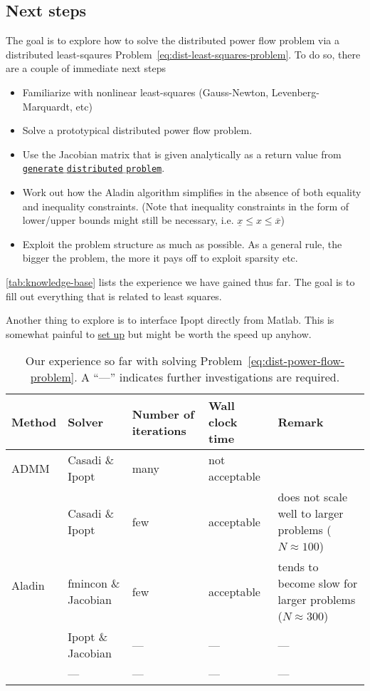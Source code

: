 \documentclass{article}
\begin{document}
\subsection{Next steps}

The goal is to explore how to solve the distributed power flow problem via a distributed least-sqaures Problem~\ref{eq:dist-least-squares-problem}.
To do so, there are a couple of immediate next steps
\begin{itemize}
    \item Familiarize with nonlinear least-squares (Gauss-Newton, Levenberg-Marquardt, etc)
    \item Solve a prototypical distributed power flow problem.
    \item Use the Jacobian matrix that is given analytically as a return value from \href{https://iai-vcs.iai.kit.edu/advancedcontrol/code/morenet/morenet/-/blob/master/03_parser/generate_distributed_problem.m}{\texttt{generate$\_$distributed$\_$problem}}.
    \item Work out how the Aladin algorithm simplifies in the absence of both equality and inequality constraints. (Note that inequality constraints in the form of lower/upper bounds might still be necessary, i.e. $\underline{x} \leq x \leq \overline{x}$)
    \item Exploit the problem structure as much as possible. As a general rule, the bigger the problem, the more it pays off to exploit sparsity etc.
\end{itemize}
\autoref{tab:knowledge-base} lists the experience we have gained thus far.
The goal is to fill out everything that is related to least squares.

Another thing to explore is to interface Ipopt directly from Matlab.
This is somewhat painful to \href{https://projects.coin-or.org/Ipopt/wiki/MatlabInterface}{set up} but might be worth the speed up anyhow.

\begin{table}
    \centering
    \caption{Our experience so far with solving Problem~\ref{eq:dist-power-flow-problem}. A ``---'' indicates further investigations are required.\label{tab:knowledge-base}}
    \begin{tabular}{llllp{4cm}}
        \toprule
        Method & Solver & Number of iterations & Wall clock time & Remark\\
        \midrule
        ADMM & Casadi \& Ipopt & many & not acceptable\\
        \midrule
        \multirow{5}{*}{Aladin} & Casadi \& Ipopt & few & acceptable & does not scale well to larger problems ($N \approx 100$)\\
         & fmincon \& Jacobian & few & acceptable & tends to become slow for larger problems ($N \approx 300$)\\
         & Ipopt \& Jacobian & --- & --- & ---\\
         \midrule
        Least squares & --- & --- & --- & ---\\
        \bottomrule
    \end{tabular}
\end{table}
\end{document}
